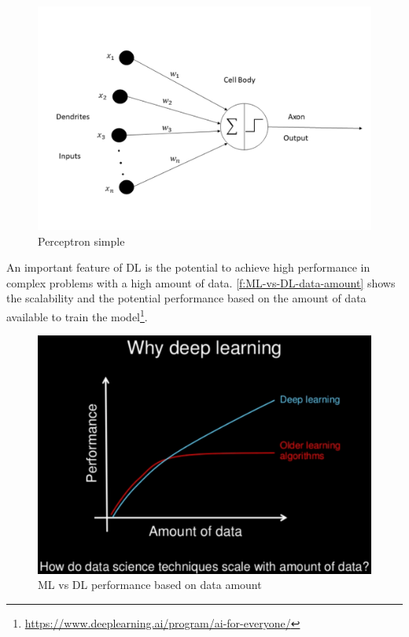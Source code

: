 \begin{figure}[h]
\centering
\includegraphics[width=\linewidth]{figures/Ch2/Perceptron.pdf}
\caption{Perceptron simple}
\label{f:Perceptron}
\end{figure}
 
An important feature of \ac{DL} is the potential to achieve high performance in complex problems with a high amount of data. \autoref{f:ML-vs-DL-data-amount} shows the scalability and the potential performance based on the amount of data available to train the model\footnote{\url{https://www.deeplearning.ai/program/ai-for-everyone/}}.

\begin{figure}[h!]
\centering
\includegraphics[width=12cm]{figures/Ch2/MlvsDL-data-amount.pdf}
\caption{ML vs DL performance based on data amount}
\label{f:ML-vs-DL-data-amount}
\end{figure} 

